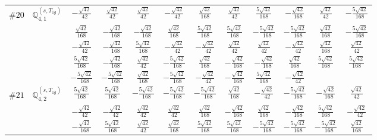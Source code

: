 \documentclass[fleqn,9pt,landscape]{jsarticle}
\begin{document}
\begin{center}
\begin{longtable}{lcccccccccc}
$ \#20\quad \mathbb{Q}_{4,1}^{(s,T_{1g})} $ & $ - \frac{\sqrt{42}}{42} $ & $ \frac{\sqrt{42}}{42} $ & $ \frac{\sqrt{42}}{42} $ & $ - \frac{\sqrt{42}}{42} $ & $ \frac{\sqrt{42}}{168} $ & $ \frac{\sqrt{42}}{42} $ & $ \frac{5 \sqrt{42}}{168} $ & $ - \frac{\sqrt{42}}{168} $ & $ \frac{\sqrt{42}}{42} $ & $ - \frac{5 \sqrt{42}}{168} $ \\
& $ \frac{\sqrt{42}}{168} $ & $ - \frac{\sqrt{42}}{168} $ & $ - \frac{\sqrt{42}}{168} $ & $ \frac{\sqrt{42}}{168} $ & $ \frac{5 \sqrt{42}}{168} $ & $ \frac{5 \sqrt{42}}{168} $ & $ - \frac{5 \sqrt{42}}{168} $ & $ - \frac{5 \sqrt{42}}{168} $ & $ \frac{\sqrt{42}}{168} $ & $ - \frac{5 \sqrt{42}}{168} $ \\
& $ - \frac{\sqrt{42}}{42} $ & $ - \frac{\sqrt{42}}{168} $ & $ \frac{5 \sqrt{42}}{168} $ & $ - \frac{\sqrt{42}}{42} $ & $ - \frac{\sqrt{42}}{42} $ & $ \frac{\sqrt{42}}{42} $ & $ \frac{\sqrt{42}}{42} $ & $ - \frac{\sqrt{42}}{42} $ & $ \frac{\sqrt{42}}{168} $ & $ \frac{\sqrt{42}}{42} $ \\
& $ \frac{5 \sqrt{42}}{168} $ & $ - \frac{\sqrt{42}}{168} $ & $ \frac{\sqrt{42}}{42} $ & $ - \frac{5 \sqrt{42}}{168} $ & $ \frac{\sqrt{42}}{168} $ & $ - \frac{\sqrt{42}}{168} $ & $ - \frac{\sqrt{42}}{168} $ & $ \frac{\sqrt{42}}{168} $ & $ \frac{5 \sqrt{42}}{168} $ & $ \frac{5 \sqrt{42}}{168} $ \\
& $ - \frac{5 \sqrt{42}}{168} $ & $ - \frac{5 \sqrt{42}}{168} $ & $ \frac{\sqrt{42}}{168} $ & $ - \frac{5 \sqrt{42}}{168} $ & $ - \frac{\sqrt{42}}{42} $ & $ - \frac{\sqrt{42}}{168} $ & $ \frac{5 \sqrt{42}}{168} $ & $ - \frac{\sqrt{42}}{42} $ & $  $ & $  $ \\ \hline
$ \#21\quad \mathbb{Q}_{4,2}^{(s,T_{1g})} $ & $ \frac{5 \sqrt{42}}{168} $ & $ \frac{5 \sqrt{42}}{168} $ & $ - \frac{5 \sqrt{42}}{168} $ & $ - \frac{5 \sqrt{42}}{168} $ & $ - \frac{5 \sqrt{42}}{168} $ & $ \frac{\sqrt{42}}{168} $ & $ - \frac{\sqrt{42}}{42} $ & $ - \frac{5 \sqrt{42}}{168} $ & $ - \frac{\sqrt{42}}{168} $ & $ \frac{\sqrt{42}}{42} $ \\
& $ - \frac{\sqrt{42}}{42} $ & $ - \frac{\sqrt{42}}{42} $ & $ \frac{\sqrt{42}}{42} $ & $ \frac{\sqrt{42}}{42} $ & $ \frac{\sqrt{42}}{168} $ & $ - \frac{\sqrt{42}}{168} $ & $ \frac{\sqrt{42}}{168} $ & $ - \frac{\sqrt{42}}{168} $ & $ \frac{5 \sqrt{42}}{168} $ & $ - \frac{\sqrt{42}}{42} $ \\
& $ - \frac{\sqrt{42}}{168} $ & $ \frac{5 \sqrt{42}}{168} $ & $ \frac{\sqrt{42}}{42} $ & $ \frac{\sqrt{42}}{168} $ & $ \frac{5 \sqrt{42}}{168} $ & $ \frac{5 \sqrt{42}}{168} $ & $ - \frac{5 \sqrt{42}}{168} $ & $ - \frac{5 \sqrt{42}}{168} $ & $ - \frac{5 \sqrt{42}}{168} $ & $ \frac{\sqrt{42}}{168} $ \\

\end{longtable}
\end{center}
\end{document}
